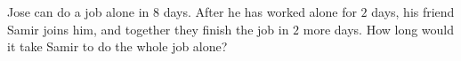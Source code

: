 Jose can do a job alone in $8$ days. After he has worked alone for $2$ days, his friend Samir joins him, and together they finish the job in $2$ more days. How long would it take Samir to do the whole job alone?
